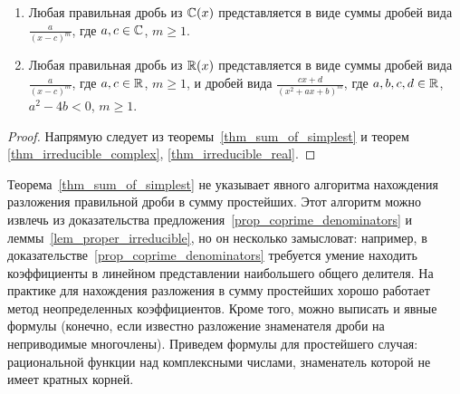 \begin{corollary}
\begin{enumerate}
\item Любая правильная дробь из $\mathbb C(x)$ представляется в виде суммы
дробей вида $\frac{a}{(x-c)^m}$, где $a,c\in\mathbb C$, $m\geq
1$.
\item Любая правильная дробь из $\mathbb R(x)$ представляется в виде суммы
дробей вида $\frac{a}{(x-c)^m}$, где $a,c\in\mathbb R$, $m\geq 1$, и
дробей вида
$\frac{cx+d}{(x^2+ax+b)^m}$, где $a,b,c,d\in\mathbb R$, $a^2-4b<0$, $m\geq
1$.
\end{enumerate}
\end{corollary}
\begin{proof}
Напрямую следует из теоремы~\ref{thm_sum_of_simplest} и теорем
\ref{thm_irreducible_complex}, \ref{thm_irreducible_real}.
\end{proof}

Теорема~\ref{thm_sum_of_simplest} не указывает явного алгоритма
нахождения разложения правильной дроби в сумму простейших. Этот
алгоритм можно извлечь из доказательства
предложения~\ref{prop_coprime_denominators} и
леммы~\ref{lem_proper_irreducible}, но он несколько замысловат:
например, в доказательстве~\ref{prop_coprime_denominators} требуется
умение находить коэффициенты в линейном представлении наибольшего
общего делителя. На практике для нахождения разложения в сумму
простейших хорошо работает метод неопределенных коэффициентов. Кроме
того, можно выписать и явные формулы (конечно, если известно
разложение знаменателя дроби на неприводимые многочлены). Приведем
формулы для простейшего случая: рациональной функции над комплексными
числами, знаменатель которой не имеет кратных корней.

